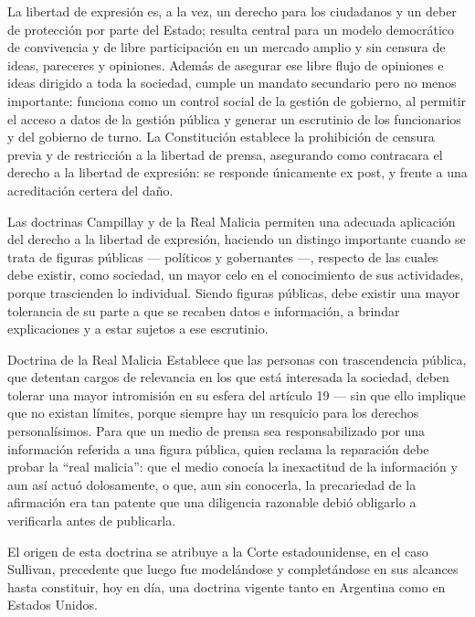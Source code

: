 \documentclass[12pt,oneside]{book}
\begin{document}
La libertad de expresión es, a la vez, un derecho para los ciudadanos y un deber de protección por parte del Estado; resulta central para un modelo democrático de convivencia y de libre participación en un mercado amplio y sin censura de ideas, pareceres y opiniones. Además de asegurar ese libre flujo de opiniones e ideas dirigido a toda la sociedad, cumple un mandato secundario pero no menos importante: funciona como un control social de la gestión de gobierno, al permitir el acceso a datos de la gestión pública y generar un escrutinio de los funcionarios y del gobierno de turno. La Constitución establece la prohibición de censura previa y de restricción a la libertad de prensa, asegurando como contracara el derecho a la libertad de expresión: se responde únicamente ex post, y frente a una acreditación certera del daño.

Las doctrinas Campillay y de la Real Malicia permiten una adecuada aplicación del derecho a la libertad de expresión, haciendo un distingo importante cuando se trata de figuras públicas --- políticos y gobernantes ---, respecto de las cuales debe existir, como sociedad, un mayor celo en el conocimiento de sus actividades, porque trascienden lo individual. Siendo figuras públicas, debe existir una mayor tolerancia de su parte a que se recaben datos e información, a brindar explicaciones y a estar sujetos a ese escrutinio.

\begin{definition}{Doctrina de la Real Malicia}
Establece que las personas con trascendencia pública, que detentan cargos de relevancia en los que está interesada la sociedad, deben tolerar una mayor intromisión en su esfera del artículo 19 --- sin que ello implique que no existan límites, porque siempre hay un resquicio para los derechos personalísimos. Para que un medio de prensa sea responsabilizado por una información referida a una figura pública, quien reclama la reparación debe probar la ``real malicia'': que el medio conocía la inexactitud de la información y aun así actuó dolosamente, o que, aun sin conocerla, la precariedad de la afirmación era tan patente que una diligencia razonable debió obligarlo a verificarla antes de publicarla.
\end{definition}

El origen de esta doctrina se atribuye a la Corte estadounidense, en el caso Sullivan, precedente que luego fue modelándose y completándose en sus alcances hasta constituir, hoy en día, una doctrina vigente tanto en Argentina como en Estados Unidos.
\end{document}

